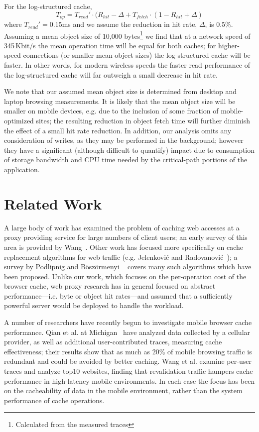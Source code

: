 \documentclass[letterpaper,twocolumn,10pt]{article}
\begin{document}
For the log-structured cache, 
\begin{equation}
T_{op} = T_{read}'\cdot (R_{hit}-\Delta + T_{fetch}\cdot (1-R_{hit}+\Delta)
\end{equation}
where $T_{read}'=0.15$ms and we assume the reduction in hit rate, $\Delta$, is $0.5\%$. 
Assuming a mean object size of 10,000 bytes\footnote{Calculated from the
  measured traces} we find that at a network speed of
345\,Kbit/s the mean operation time will be equal for both caches; for
higher-speed connections (or smaller mean object sizes) the log-structured cache
will be faster. 
In other words, for modern wireless speeds the faster read performance
of the log-structured cache will far outweigh a small decrease in hit rate. 

We note that our assumed mean object size is determined from desktop
and laptop browsing measurements. It is likely that the mean object size will be
smaller on mobile devices, e.g. due to the inclusion of some fraction
of mobile-optimized sites; the resulting reduction in object fetch time will
further diminish the effect of a small hit rate reduction.
In addition, our analysis omits any consideration of writes, as they may
be performed in the background; however they have a significant (although
difficult to quantify) impact due to consumption of storage bandwidth and CPU
time needed by the critical-path portions of the application.

\section{Related Work}
A large body of work has examined the problem of caching web accesses at a proxy
providing service for large numbers of client users; an early survey of this
area is provided by Wang~\cite{wang_survey_1999}. Other work has focused more
specifically on cache replacement algorithms for web traffic
(e.g. Jelenkovi\'{c} and Radovanovi\'{c}~\cite{Jelenkovic_optimizing_2004}); a
survey by Podlipnig and B\"{o}sz\"{o}rmenyi ~\cite{podlipnig_survey_2003} covers
many such algorithms which have been proposed. Unlike our work, which focuses on
the per-operation cost of the browser cache, web proxy research has in general
focused on abstract performance---i.e. byte or object hit rates---and assumed
that a sufficiently powerful server would be deployed to handle the workload.

A number of researchers have recently begun to investigate mobile browser cache
performance. Qian et al. at Michigan~\cite{qian_web_2012} have analyzed data
collected by a cellular provider, as well as additional user-contributed traces,
measuring cache effectiveness; their results show that as much as 20\% of mobile
browsing traffic is redundant and could be avoided by better caching. Wang et
al. \cite{wang_how_2011} examine per-user traces and analyze top10 websites,
finding that revalidation traffic hampers cache performance in high-latency
mobile environments. In each case the focus has been on the cacheability of data
in the mobile environment, rather than the system performance of cache
operations.
\end{document}
